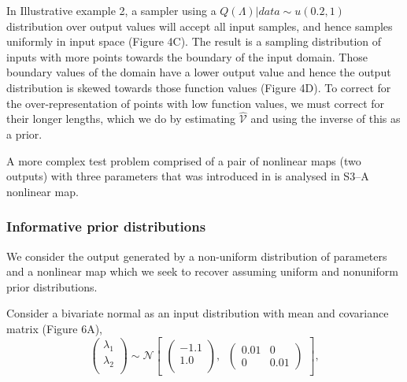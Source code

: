 \documentclass[10pt,letterpaper]{article}
\begin{document}
\vspace{0.5cm}

In Illustrative example 2, a sampler using a $Q(\Lambda)|data\sim u(0.2,1)$ distribution over output values will accept all input samples, and hence samples uniformly in input space (Figure 4C). The result is a sampling distribution of inputs with more points towards the boundary of the input domain. Those boundary values of the domain have a lower output value and hence the output distribution is skewed towards those function values (Figure 4D). To correct for the over-representation of points with low function values, we must correct for their longer lengths, which we do by estimating $\widehat{\mathcal{V}}$ and using the inverse of this as a prior.

\bigskip
A more complex test problem comprised of a pair of nonlinear maps (two outputs) with three parameters that was introduced in \cite{butler2014measure} is analysed in S3--A nonlinear map.


\subsubsection{Informative prior distributions}

We consider the output generated by a non-uniform distribution of parameters and a nonlinear map which we seek to recover assuming uniform and nonuniform prior distributions.

\bigskip
{}

Consider a bivariate normal as an input distribution with mean and covariance matrix (Figure 6A),
%
\begin{equation}\label{eq:inputDistributionUnidentified}
\begin{pmatrix}\lambda_1\\
\lambda_2\\
\end{pmatrix} \sim  \mathcal{N}
\begin{bmatrix}
\begin{pmatrix}
-1.1\\
1.0\\
\end{pmatrix}, \;\;
\begin{pmatrix}
0.01 & 0\\
0 & 0.01
\end{pmatrix}
\end{bmatrix},
\end{equation}
%
\end{document}
